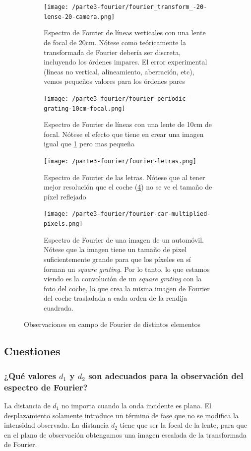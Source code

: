 \documentclass{./packages/optica-article}
\begin{document}
\begin{figure}[hptb]
	\begin{center}
		\begin{subfigure}[t]{0.45\textwidth}\centering
			\texttt{[image: /parte3-fourier/fourier\_transform\_-20-lense-20-camera.png]}
			\caption{Espectro de Fourier de líneas verticales  con una lente de focal de 20cm. Nótese como teóricamente la transformada de Fourier debería ser discreta, incluyendo los órdenes impares. El error experimental (líneas no vertical, alineamiento, aberración, etc), vemos pequeños valores para los órdenes pares}
			\label{fig:fourier1}
		\end{subfigure}
		\quad
		\begin{subfigure}[t]{0.45\textwidth}\centering
			\texttt{[image: /parte3-fourier/fourier-periodic-grating-10cm-focal.png]}
			\caption{Espectro de Fourier de líneas con una lente de 10cm de focal. Nótese el efecto que tiene en crear una imagen igual que \ref{fig:fourier1} pero mas pequeña}
			\label{fourier4}
		\end{subfigure}

		\begin{subfigure}[t]{0.45\textwidth}\centering
			\texttt{[image: /parte3-fourier/fourier-letras.png]}
			\caption{Espectro de Fourier de las letras. Nótese que al tener mejor resolución que el coche (\ref{fig:fourier2}) no se ve el tamaño de píxel reflejado}
			\label{fourier3}
		\end{subfigure}
		\quad
		\begin{subfigure}[t]{0.45\textwidth}\centering
			\texttt{[image: /parte3-fourier/fourier-car-multiplied-pixels.png]}
			\caption{Espectro de Fourier de una imagen de un automóvil. Nótese que la imagen tiene un tamaño de pixel suficientemente grande para que los píxeles en sí forman un \emph{square grating}. Por lo tanto, lo que estamos viendo es la convolución de un \emph{square grating} con la foto del coche, lo que crea la misma imagen de Fourier del coche trasladada a cada orden de la rendija cuadrada.}
			\label{fig:fourier2}
		\end{subfigure}
		\caption{Observaciones en campo de Fourier de distintos elementos}\label{fig:fourier:all}
	\end{center}
\end{figure}

\subsection{Cuestiones}
\subsubsection{ ¿Qué valores $d_1$ y $d_2$ son adecuados para la observación del espectro de Fourier?}
La distancia de $d_{1}$ no importa cuando la onda incidente es plana. El desplazamiento solamente introduce un término de fase que no se modifica la intensidad observada. La distancia $d_{2}$ tiene que ser la focal de la lente, para que en el plano de observación obtengamos una imagen escalada de la transformada de Fourier.
\end{document}
